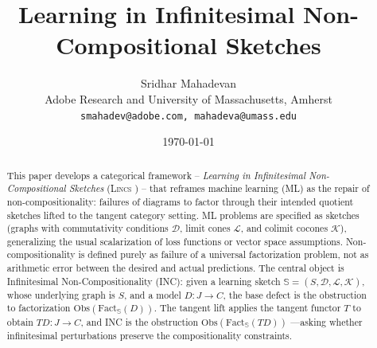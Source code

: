 \documentclass{article}
\title{Learning in Infinitesimal Non-Compositional Sketches}
\author{Sridhar Mahadevan\\
Adobe Research and University of Massachusetts, Amherst\\
\texttt{smahadev@adobe.com, mahadeva@umass.edu}}
\date{\today}
\begin{document}
\maketitle

\begin{abstract}
This paper develops a categorical framework -- \emph{Learning in Infinitesimal Non-Compositional Sketches} (\textsc{Lincs}  ) --  that reframes machine learning (ML)  as the repair of non-compositionality: failures of diagrams to factor through their intended quotient sketches lifted to the tangent category setting. ML problems are specified as sketches (graphs with commutativity conditions $\mathcal D$, limit cones $\mathcal L$, and colimit cocones $\mathcal K$), generalizing the usual scalarization of loss functions or vector space assumptions. Non-compositionality is defined purely as failure of a universal factorization problem, not as arithmetic error between the desired and actual predictions.  The central object is Infinitesimal Non-Compositionality (INC): given a learning sketch $\mathbb S=(S,\mathcal D,\mathcal L,\mathcal K)$, whose underlying graph is $S$, and a model $D:J \rightarrow C$, the base defect is the obstruction to factorization $\mbox{Obs}(\mbox{Fact}_{\mathbb S}(D))$.  The tangent lift applies the tangent functor $T$ to obtain $TD:J \rightarrow C$, and INC is the obstruction $\mbox{Obs}(\mbox{Fact}_{\mathbb S}(TD))$ —asking whether infinitesimal perturbations preserve the compositionality constraints.


\end{abstract}
\end{document}
